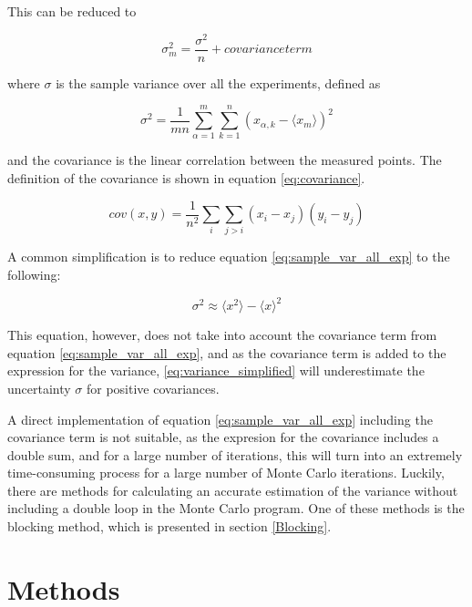 \documentclass[norsk,a4paper,12pt]{article}
\begin{document}
This can be reduced to 

\begin{equation}
\label{eq:sample_var_all_exp}
\sigma_m^2 = \frac{\sigma^2}{n} + covariance term
\end{equation}

where $\sigma$ is the sample variance over all the experiments, defined as 

\begin{equation}
\sigma^2 = \frac{1}{mn} \sum_{\alpha=1}^m \sum_{k=1}^n (x_{\alpha, k} - \langle x_m \rangle )^2
\end{equation}

and the covariance is the linear correlation between the measured points. The definition of the covariance is shown in equation \ref{eq:covariance}.

\begin{equation}
\label{eq:covariance}
cov(x,y) = \frac{1}{n^2} \sum_i \sum_{j >i} (x_i - x_j) (y_i - y_j)
\end{equation}

A common simplification is to reduce equation \ref{eq:sample_var_all_exp} to the following:

\begin{equation}
\label{eq:variance_simplified}
\sigma^2 \approx \langle x^2 \rangle - \langle x \rangle^2
\end{equation}

This equation, however, does not take into account the covariance term from equation \ref{eq:sample_var_all_exp}, and as the covariance term is added to the expression for the variance, \ref{eq:variance_simplified} will underestimate the uncertainty $\sigma$ for positive covariances.

A direct implementation of equation \ref{eq:sample_var_all_exp} including the covariance term is not suitable, as the expresion for the covariance includes a double sum, and for a large number of iterations, this will turn into an extremely time-consuming process for a large number of Monte Carlo iterations. Luckily, there are methods for calculating an accurate estimation of the variance without including a double loop in the Monte Carlo program. One of these methods is the blocking method, which is presented in section \ref{Blocking}.

\section{Methods}
\end{document}
